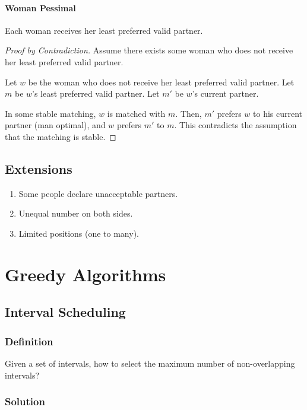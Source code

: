 \documentclass[a4paper,12pt]{article}
\begin{document}
\paragraph{Woman Pessimal} Each woman receives her least preferred valid partner.

\begin{proof}[Proof by Contradiction]
Assume there exists some woman who does not receive her least preferred valid partner.

Let $w$ be the woman who does not receive her least preferred valid partner. Let $m$ be $w$'s least preferred valid partner. Let $m'$ be $w$'s current partner. 

In some stable matching, $w$ is matched with $m$. Then, $m'$ prefers $w$ to his current partner (man optimal), and $w$ prefers $m'$ to $m$. This contradicts the assumption that the matching is stable.
\end{proof}

\subsection{Extensions}

\begin{enumerate}
	\item Some people declare unacceptable partners. 
	\item Unequal number on both sides.
	\item Limited positions (one to many).
\end{enumerate}

\section{Greedy Algorithms}

\subsection{Interval Scheduling}

\subsubsection{Definition}

Given a set of intervals, how to select the maximum number of non-overlapping intervals?

\subsubsection{Solution}
\end{document}
